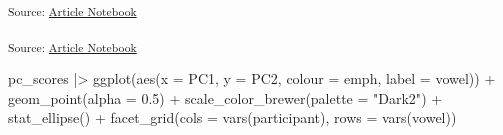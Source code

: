 \documentclass[
]{interact}
\newenvironment{Shaded}{\begin{snugshade}}{\end{snugshade}}
\newcommand{\AttributeTok}[1]{\textcolor[rgb]{0.40,0.45,0.13}{#1}}
\newcommand{\CommentTok}[1]{\textcolor[rgb]{0.37,0.37,0.37}{#1}}
\newcommand{\DecValTok}[1]{\textcolor[rgb]{0.68,0.00,0.00}{#1}}
\newcommand{\FloatTok}[1]{\textcolor[rgb]{0.68,0.00,0.00}{#1}}
\newcommand{\FunctionTok}[1]{\textcolor[rgb]{0.28,0.35,0.67}{#1}}
\newcommand{\NormalTok}[1]{\textcolor[rgb]{0.00,0.23,0.31}{#1}}
\newcommand{\OtherTok}[1]{\textcolor[rgb]{0.00,0.23,0.31}{#1}}
\newcommand{\SpecialCharTok}[1]{\textcolor[rgb]{0.37,0.37,0.37}{#1}}
\newcommand{\StringTok}[1]{\textcolor[rgb]{0.13,0.47,0.30}{#1}}
\begin{document}
\textsubscript{Source:
\href{https://stefanocoretta.github.io/mv_uti/index.qmd.html}{Article
Notebook}}

\begin{Shaded}
\end{Shaded}

\textsubscript{Source:
\href{https://stefanocoretta.github.io/mv_uti/index.qmd.html}{Article
Notebook}}

\label{cell-fig-emph-speakers}
\begin{Shaded}
\begin{Highlighting}[]
\NormalTok{pc\_scores }\SpecialCharTok{|\textgreater{}} 
  \FunctionTok{ggplot}\NormalTok{(}\FunctionTok{aes}\NormalTok{(}\AttributeTok{x =}\NormalTok{ PC1, }\AttributeTok{y =}\NormalTok{ PC2, }\AttributeTok{colour =}\NormalTok{ emph, }\AttributeTok{label =}\NormalTok{ vowel)) }\SpecialCharTok{+}
  \FunctionTok{geom\_point}\NormalTok{(}\AttributeTok{alpha =} \FloatTok{0.5}\NormalTok{) }\SpecialCharTok{+}
  \FunctionTok{scale\_color\_brewer}\NormalTok{(}\AttributeTok{palette =} \StringTok{"Dark2"}\NormalTok{) }\SpecialCharTok{+}
  \FunctionTok{stat\_ellipse}\NormalTok{() }\SpecialCharTok{+}
  \FunctionTok{facet\_grid}\NormalTok{(}\AttributeTok{cols =} \FunctionTok{vars}\NormalTok{(participant), }\AttributeTok{rows =} \FunctionTok{vars}\NormalTok{(vowel))}
\end{Highlighting}
\end{Shaded}
\end{document}
